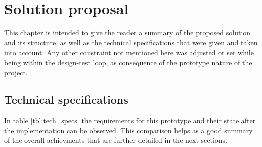 \chapter{Solution proposal}\label{cha:solution}

This chapter is intended to give the reader a summary of the proposed solution and its structure, as well as 
the technical specifications that were given and taken into account. Any other constraint not mentioned here 
was adjusted or set while being within the design-test loop, as consequence of the prototype nature of the project.

\section{Technical specifications}

In table \ref{tbl:tech_specs} the requirements for this prototype and their state after the implementation can be observed.
This comparison helps as a good summary of the overall achievments that are further detailed in the next sections.

